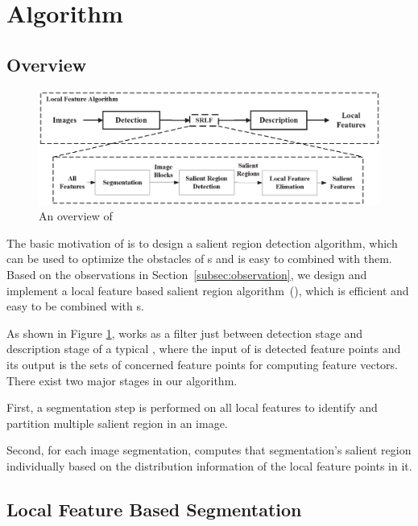 \section{{\sys} Algorithm}
\label{sec:algorithm}

\subsection{Overview}
\label{sec:algorithm_overview}

\begin{figure}[!ht]
\centering
\includegraphics[width=4.5in]{images/fig-overview.eps}
\caption{An overview of {\sys}}
\label{fig:overview}
\end{figure}

The basic motivation of {\sys} is to design a salient region detection algorithm, which can be used to optimize the obstacles of {\lfea}s and is easy to combined with them. Based on the observations in Section~\ref{subsec:observation}, we design and implement a local feature based salient region algorithm~({\sys}), which is efficient and easy to be combined with {\lfea}s.    

As shown in Figure \ref{fig:overview}, {\sys} works as a filter just between detection stage and description stage of a typical {\lfea}, where the input of {\sys} is detected feature points and its output is the sets of concerned feature points for computing feature vectors. There exist two major stages in our algorithm.
\begin{inparaenum}
\item First, a segmentation step is performed on all local features to identify and partition multiple salient region in an image. 
\item Second, for each image segmentation, {\sys} computes that segmentation's salient region individually based on the distribution information of the local feature points in it.
\end{inparaenum}


\subsection{Local Feature Based Segmentation}
\label{sec:algorithm_segmentation}

